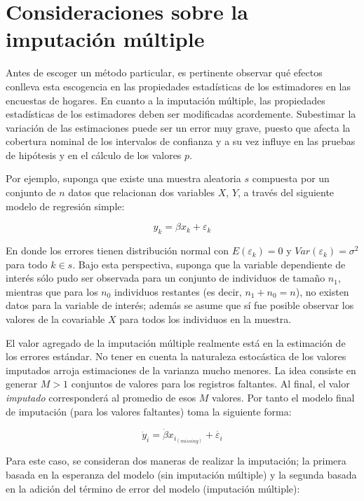 \documentclass[
  12pt,
]{book}
\begin{document}
\hypertarget{consideraciones-sobre-la-imputaciuxf3n-muxfaltiple}{%
\section{Consideraciones sobre la imputación múltiple}\label{consideraciones-sobre-la-imputaciuxf3n-muxfaltiple}}

Antes de escoger un método particular, es pertinente observar qué efectos conlleva esta escogencia en las propiedades estadísticas de los estimadores en las encuestas de hogares. En cuanto a la imputación múltiple, las propiedades estadísticas de los estimadores deben ser modificadas acordemente. Subestimar la variación de las estimaciones puede ser un error muy grave, puesto que afecta la cobertura nominal de los intervalos de confianza y a su vez influye en las pruebas de hipótesis y en el cálculo de los valores \(p\).

Por ejemplo, suponga que existe una muestra aleatoria \(s\) compuesta por un conjunto de \(n\) datos que relacionan dos variables \(X\), \(Y\), a través del siguiente modelo de regresión simple:

\[
y_k = \beta x_k + \varepsilon_k
\]

En donde los errores tienen distribución normal con \(E(\varepsilon_k) = 0\) y \(Var(\varepsilon_k) = \sigma ^2\) para todo \(k\in s\). Bajo esta perspectiva, suponga que la variable dependiente de interés sólo pudo ser observada para un conjunto de individuos de tamaño \(n_1\), mientras que para los \(n_0\) individuos restantes (es decir, \(n_1 + n_0 = n\)), no existen datos para la variable de interés; además se asume que sí fue posible observar los valores de la covariable \(X\) para todos los individuos en la muestra.

El valor agregado de la imputación múltiple \citep{Rubin_1987} realmente está en la estimación de los errores estándar. No tener en cuenta la naturaleza estocástica de los valores imputados arroja estimaciones de la varianza mucho menores. La idea consiste en generar \(M > 1\) conjuntos de valores para los registros faltantes. Al final, el valor \emph{imputado} corresponderá al promedio de esos \(M\) valores. Por tanto el modelo final de imputación (para los valores faltantes) toma la siguiente forma:

\[\dot{y}_i = \dot{\beta} x_{i_{(missing)}}+ \dot{\varepsilon_i}\]

Para este caso, se consideran dos maneras de realizar la imputación; la primera basada en la esperanza del modelo (sin imputación múltiple) y la segunda basada en la adición del término de error del modelo (imputación múltiple):
\end{document}
